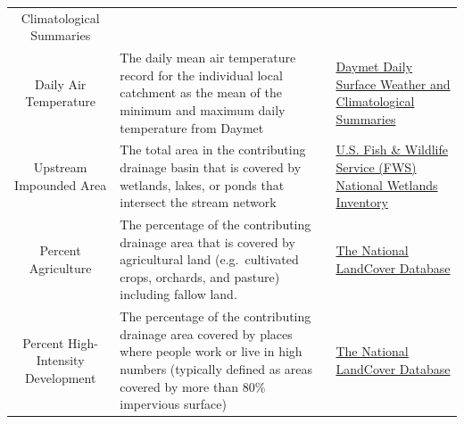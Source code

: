 \begin{longtable}[]{@{}cll@{}}
\begin{minipage}[t]{0.23\columnwidth}
{Climatological Summaries}\strut
\end{minipage}\tabularnewline
\begin{minipage}[t]{0.19\columnwidth}\centering\strut
Daily Air Temperature\strut
\end{minipage} & \begin{minipage}[t]{0.43\columnwidth}\raggedright\strut
The daily mean air temperature record for the individual local catchment
as the mean of the minimum and maximum daily temperature from
Daymet\strut
\end{minipage} & \begin{minipage}[t]{0.23\columnwidth}\raggedright\strut
\href{https://daymet.ornl.gov/}{Daymet Daily Surface Weather and
Climatological Summaries}\strut
\end{minipage}\tabularnewline
\begin{minipage}[t]{0.19\columnwidth}\centering\strut
Upstream Impounded Area\strut
\end{minipage} & \begin{minipage}[t]{0.43\columnwidth}\raggedright\strut
The total area in the contributing drainage basin that is covered by
wetlands, lakes, or ponds that intersect the stream network\strut
\end{minipage} & \begin{minipage}[t]{0.23\columnwidth}\raggedright\strut
\href{http://www.fws.gov/wetlands/Data/Data-Download.html}{U.S. Fish \&
Wildlife Service (FWS) National Wetlands Inventory}\strut
\end{minipage}\tabularnewline
\begin{minipage}[t]{0.19\columnwidth}\centering\strut
Percent Agriculture\strut
\end{minipage} & \begin{minipage}[t]{0.43\columnwidth}\raggedright\strut
The percentage of the contributing drainage area that is covered by
agricultural land (e.g.~cultivated crops, orchards, and pasture)
including fallow land.\strut
\end{minipage} & \begin{minipage}[t]{0.23\columnwidth}\raggedright\strut
\href{http://www.mrlc.gov/nlcd06_data.php}{The National LandCover
Database}\strut
\end{minipage}\tabularnewline
\begin{minipage}[t]{0.19\columnwidth}\centering\strut
Percent High-Intensity Development\strut
\end{minipage} & \begin{minipage}[t]{0.43\columnwidth}\raggedright\strut
The percentage of the contributing drainage area covered by places where
people work or live in high numbers (typically defined as areas covered
by more than 80\% impervious surface)\strut
\end{minipage} & \begin{minipage}[t]{0.23\columnwidth}\raggedright\strut
\href{http://www.mrlc.gov/nlcd06_data.php}{The National LandCover
Database}\strut
\end{minipage}\tabularnewline
\bottomrule
\end{longtable}

